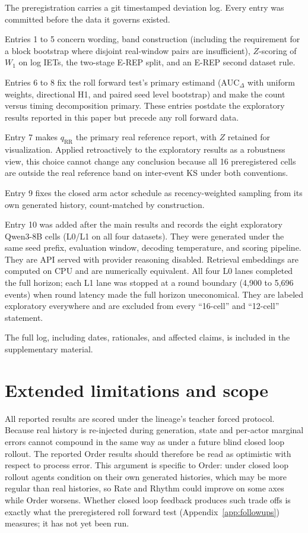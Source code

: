The preregistration carries a git timestamped deviation log. Every entry was
committed before the data it governs existed.

Entries 1 to 5 concern wording, band construction (including the requirement for
a block bootstrap where disjoint real-window pairs are insufficient),
$Z$-scoring of $W_1$ on log IETs, the two-stage E-REP split, and an E-REP
second dataset rule.

Entries 6 to 8 fix the roll forward test's primary estimand
($\mathrm{AUC}_{\Delta}$ with uniform weights, directional H1, and paired
seed level bootstrap) and make the count versus timing decomposition primary.
These entries postdate the exploratory results reported in this paper but
precede any roll forward data.

Entry 7 makes $q_{\mathrm{RR}}$ the primary real reference report, with
$Z$ retained for visualization. Applied retroactively to the exploratory
results as a robustness view, this choice cannot change any conclusion because
all 16 preregistered cells are outside the real reference band on
inter-event KS under both conventions.

Entry 9 fixes the closed arm actor schedule as recency-weighted sampling from
its own generated history, count-matched by construction.

Entry 10 was added after the main results and records the eight exploratory
Qwen3-8B cells (L0/L1 on all four datasets). They were generated under the same
seed prefix, evaluation window, decoding temperature, and scoring pipeline.
They are API served with provider reasoning disabled. Retrieval embeddings are
computed on CPU and are numerically equivalent. All four L0 lanes completed the
full horizon; each L1 lane was stopped at a round boundary
(4,900 to 5,696 events) when round latency made the full horizon uneconomical.
They are labeled exploratory everywhere and are excluded from every
``16-cell'' and ``12-cell'' statement.

The full log, including dates, rationales, and affected claims, is included in
the supplementary material.


\section{Extended limitations and scope}
\label{app:limitations}

All reported results are scored under the lineage's teacher forced protocol.
Because real history is re-injected during generation, state and per-actor
marginal errors cannot compound in the same way as under a future blind closed
loop rollout. The reported Order results should therefore be read as optimistic
with respect to process error. This argument is specific to Order:
under closed loop rollout agents condition on their own generated histories,
which may be more regular than real histories, so Rate and Rhythm could improve
on some axes while Order worsens. Whether closed loop feedback produces such
trade offs is exactly what the preregistered roll forward test
(Appendix~\ref{app:followups}) measures; it has not yet been run.

